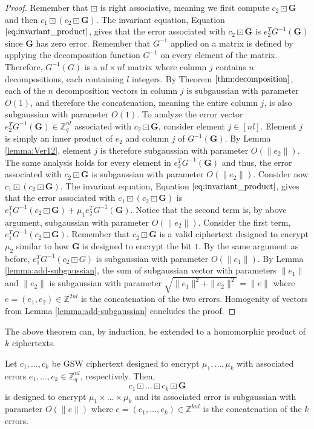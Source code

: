 \begin{proof}
    Remember that $\boxdot$ is right associative, meaning we first compute $c_2 \boxdot \mathbf{G}$ and then $c_1 \boxdot (c_2 \boxdot \mathbf{G})$. The invariant equation, Equation $\ref{eq:invariant_product}$, gives that the error associated with $c_2 \boxdot \mathbf{G}$ is $e_2^TG^{-1}(\mathbf{G})$ since $\mathbf{G}$ has zero error. Remember that $G^{-1}$ applied on a matrix is defined by applying the decomposition function $G^{-1}$ on every element of the matrix. Therefore, $G^{-1}(G)$ is a $nl \times nl$ matrix where column $j$ contains $n$ decompositions, each containing $l$ integers. By Theorem $\ref{thm:decomposition}$, each of the $n$ decomposition vectors in column $j$ is subgaussian with parameter $O(1)$, and therefore the concatenation, meaning the entire column $j$, is also subgaussian with parameter $O(1)$. To analyze the error vector $e_2^TG^{-1}(\mathbf{G}) \in \mathbb{Z}_q^{nl}$ associated with $c_2 \boxdot \mathbf{G}$, consider element $j \in [nl]$. Element $j$ is simply an inner product of $e_2$ and column $j$ of $G^{-1}(\mathbf{G})$. By Lemma \ref{lemma:Ver12}, element $j$ is therefore subgaussian with parameter $O(\|e_2\|)$. The same analysis holds for every element in $e_2^TG^{-1}(\mathbf{G})$ and thus, the error associated with $c_2 \boxdot \mathbf{G}$ is subgaussian with parameter $O(\| e_2 \|)$.
    Consider now $c_1 \boxdot (c_2 \boxdot \mathbf{G})$. The invariant equation, Equation $\ref{eq:invariant_product}$, gives that the error associated with $c_1 \boxdot (c_2 \boxdot \mathbf{G})$ is $e_1^TG^{-1}(c_2 \boxdot \mathbf{G}) + \mu_1 e_2^TG^{-1}(\mathbf{G})$. Notice that the second term is, by above argument, subgaussian with parameter $O(\|e_2\|)$. Consider the first term, $e_1^TG^{-1}(c_2 \boxdot \mathbf{G})$. Remember that $c_2 \boxdot \mathbf{G}$ is a valid ciphertext designed to encrypt $\mu_2$ similar to how $\mathbf{G}$ is designed to encrypt the bit $1$. By the same argument as before, $e_1^TG^{-1}(c_2 \boxdot G)$ is subgaussian with parameter $O(\|e_1\|)$. By Lemma \ref{lemma:add-subgaussian}, the sum of subgaussian vector with parameters $\|e_1\|$ and $\|e_2\|$ is subgaussian with parameter $\sqrt{\|e_1\|^2 + \|e_2\|^2} = \|e\|$ where $e = (e_1, e_2) \in \mathbb{Z}^{2nl}$ is the concatenation of the two errors. Homogenity of vectors from Lemma \ref{lemma:add-subgaussian} concludes the proof.
\end{proof}
The above theorem can, by induction, be extended to a homomorphic product of $k$ ciphertexts. 
\begin{corollary}\label{cor:hom_product}
    Let $c_1, \dots, c_k$ be GSW ciphertext designed to encrypt $\mu_1, \dots, \mu_k$ with associated errors $e_1, \dots, e_k \in \mathbb{Z}_q^{nl}$, respectively. Then,
    \begin{equation}
        c_1 \boxdot \dots \boxdot c_k \boxdot \mathbf{G} 
    \end{equation}
    is designed to encrypt $\mu_1 \times \dots \times \mu_k$ and its associated error is subgaussian with parameter $O(\|e\|)$ where $e = (e_1, \dots, e_k) \in \mathbb{Z}^{knl}$ is the concatenation of the $k$ errors.
\end{corollary}
